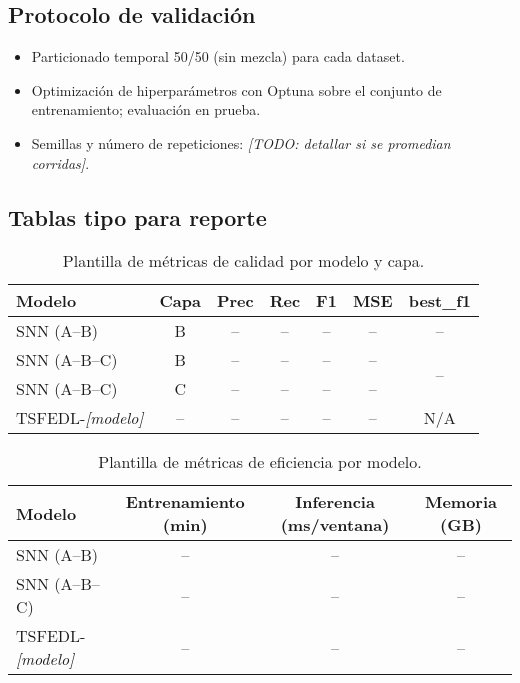 \subsection{Protocolo de validación}
\begin{itemize}
    \item Particionado temporal 50/50 (sin mezcla) para cada dataset.
    \item Optimización de hiperparámetros con Optuna sobre el conjunto de entrenamiento; evaluación en prueba. 
    \item Semillas y número de repeticiones: \textit{[TODO: detallar si se promedian corridas]}.
\end{itemize}

\subsection{Tablas tipo para reporte}
\begin{table}[htbp]
\centering
\small
\begin{tabular}{lcccccc}
\hline\hline
\textbf{Modelo} & \textbf{Capa} & \textbf{Prec} & \textbf{Rec} & \textbf{F1} & \textbf{MSE} & \textbf{best\_f1} \\
\hline
SNN (A--B) & B & -- & -- & -- & -- & -- \\
SNN (A--B--C) & B & -- & -- & -- & -- & \multirow{2}{*}{--} \\
SNN (A--B--C) & C & -- & -- & -- & -- & \\
TSFEDL-\textit{[modelo]} & -- & -- & -- & -- & -- & N/A \\
\hline\hline
\end{tabular}
\caption{Plantilla de métricas de calidad por modelo y capa.}
\label{tab:metricas-calidad}
\end{table}

\begin{table}[htbp]
\centering
\small
\begin{tabular}{lccc}
\hline\hline
\textbf{Modelo} & \textbf{Entrenamiento (min)} & \textbf{Inferencia (ms/ventana)} & \textbf{Memoria (GB)} \\
\hline
SNN (A--B) & -- & -- & -- \\
SNN (A--B--C) & -- & -- & -- \\
TSFEDL-\textit{[modelo]} & -- & -- & -- \\
\hline\hline
\end{tabular}
\caption{Plantilla de métricas de eficiencia por modelo.}
\label{tab:metricas-eficiencia}
\end{table}